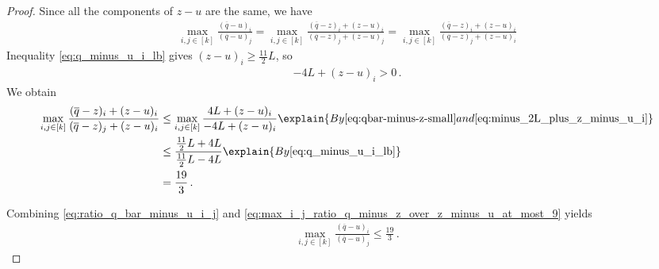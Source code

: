 \documentclass[11pt]{article}
\begin{document}
\begin{proof}
    Since all the components of $z-u$ are the same, we have 
    \begin{align}
        \max_{i, j \in [k]} \frac{(\overline{q}-u)_i}{(\overline{q}-u)_j}  =  \max_{i, j \in [k]} \frac{(\overline{q}-z)_i + (z-u)_i}{(\overline{q}-z)_j + (z-u)_j} =  \max_{i, j \in [k]} \frac{(\overline{q}-z)_i + (z-u)_i}{(\overline{q}-z)_j + (z-u)_i} \label{eq:ratio_q_bar_minus_u_i_j}
\end{align}
Inequality \eqref{eq:q_minus_u_i_lb} gives $(z-u)_i \geq \frac{11}{2}L$, so 
\begin{align}
    -4L + (z-u)_i > 0\,. \label{eq:minus_2L_plus_z_minus_u_i}
\end{align}
We obtain 
\begin{align} 
        \max_{i, j \in [k]} \frac{(\overline{q}-z)_i + (z-u)_i}{(\overline{q}-z)_j + (z-u)_i}  & \leq \max_{i, j \in [k]} \frac{4L + (z - u)_i}{-4L + (z-u)_i} \explain{By \eqref{eq:qbar-minus-z-small} and \eqref{eq:minus_2L_plus_z_minus_u_i}} \\
        & \leq \frac{\frac{11}{2}L + 4L}{\frac{11}{2}L - 4L} \explain{By \eqref{eq:q_minus_u_i_lb}} \\
        &= \frac{19}{3}\,. \label{eq:max_i_j_ratio_q_minus_z_over_z_minus_u_at_most_9}
    \end{align}

    Combining \eqref{eq:ratio_q_bar_minus_u_i_j}  and \eqref{eq:max_i_j_ratio_q_minus_z_over_z_minus_u_at_most_9} yields 
    \begin{align}\label{eq:qbar-minus-u-coordinate-ratio}
        \max_{i, j \in [k]} \frac{(\overline{q}-u)_i}{(\overline{q}-u)_j} \leq \frac{19}{3}\,.
    \end{align}


\end{proof}
\end{document}
